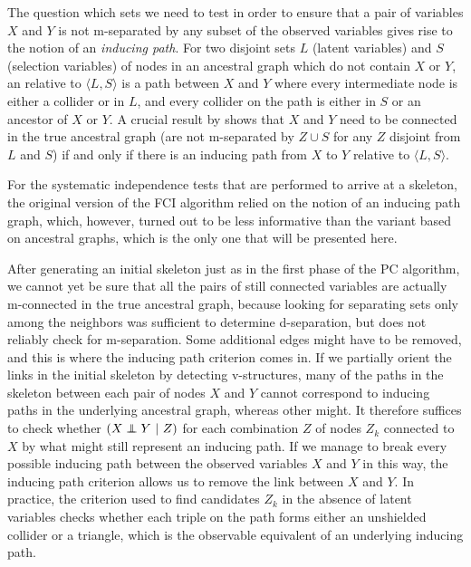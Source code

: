 The question which sets we need to test in order to ensure that a pair of variables $X$ and $Y$ is not m-separated by any subset of the observed variables gives rise to the notion of an \textit{inducing path}. For two disjoint sets $L$ (latent variables) and $S$ (selection variables) of nodes in an ancestral graph which do not contain $X$ or $Y$, an  relative to $\langle L,S \rangle$ is a path between $X$ and $Y$ where every intermediate node is either a collider or in $L$, and every collider on the path is either in $S$ or an ancestor of $X$ or $Y$. A crucial result by \cite{richardson_spirtes_2002} shows that $X$ and $Y$ need to be connected in the true ancestral graph (are not m-separated by $Z \cup S$ for any $Z$ disjoint from $L$ and $S$) if and only if there is an inducing path from $X$ to $Y$ relative to $\langle L,S \rangle$.

For the systematic independence tests that are performed to arrive at a skeleton, the original version of the FCI algorithm relied on the notion of an inducing path graph, which, however, turned out \citep{zhang2006} to be less informative than the variant based on ancestral graphs, which is the only one that will be presented here.

After generating an initial skeleton just as in the first phase of the PC algorithm, we cannot yet be sure that all the pairs of still connected variables are actually m-connected in the true ancestral graph, because looking for separating sets only among the neighbors was sufficient to determine d-separation, but does not reliably check for m-separation. Some additional edges might have to be removed, and this is where the inducing path criterion comes in. If we partially orient the links in the initial skeleton by detecting v-structures, many of the paths in the skeleton between each pair of nodes $X$ and $Y$ cannot correspond to inducing paths in the underlying ancestral graph, whereas other might. It therefore suffices to check whether $(X \indep Y\ |\ Z)$ for each combination $Z$ of nodes $Z_k$ connected to $X$ by what might still represent an inducing path. If we manage to break every possible inducing path between the observed variables $X$ and $Y$ in this way, the inducing path criterion allows us to 
remove the link between $X$ and $Y$. In practice, the criterion used to find candidates $Z_k$ in the absence of latent variables checks whether each triple on the path forms either an unshielded collider or a triangle, which is the observable equivalent of an underlying inducing path.

